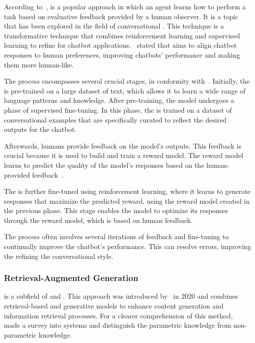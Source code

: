 According to~\citet{li_human-centered_2019}, {\rlhf} is a popular approach in which an agent learns how to perform a task based on evaluative feedback provided by a human observer. It is a topic that has been explored in the field of conversational {\ai}. This technique is a transformative technique that combines reinforcement learning and supervised learning to refine {\llm} for chatbot applications.~\citet{tran_enhancing_2023} stated that {\rlhf} aims to align chatbot responses to human preferences, improving chatbots' performance and making them more human-like.

The process encompasses several crucial stages, in conformity with~\citet{axelsson_modeling_2022}. Initially, the {\llm} is pre-trained on a large dataset of text, which allows it to learn a wide range of language patterns and knowledge. After pre-training, the model undergoes a phase of supervised fine-tuning. In this phase, the {\llm} is trained on a dataset of conversational examples that are specifically curated to reflect the desired outputs for the chatbot. 

Afterwards, humans provide feedback on the model's outputs. This feedback is crucial because it is used to build and train a reward model. The reward model learns to predict the quality of the model's responses based on the human-provided feedback~\cite{axelsson_modeling_2022}.

The {\llm} is further fine-tuned using reinforcement learning, where it learns to generate responses that maximize the predicted reward, using the reward model created in the previous phase. This stage enables the model to optimize its responses through the reward model, which is based on human feedback.

The process often involves several iterations of feedback and fine-tuning to continually improve the chatbot's performance. This can resolve errors, improving the refining the conversational style.



\subsubsection{Retrieval-Augmented Generation}
\label{rag_section}

{\rag} is a subfield of {\nlp} and {\ai}. This approach was introduced by~\citet{lewis_retrieval-augmented_2020} in 2020 and combines retrieval-based and generative models to enhance content generation and information retrieval processes. For a clearer comprehension of this method,~\citet{gao_retrieval-augmented_2023} made a survey into {\rag} systems and distinguish the parametric knowledge from non-parametric knowledge. 


